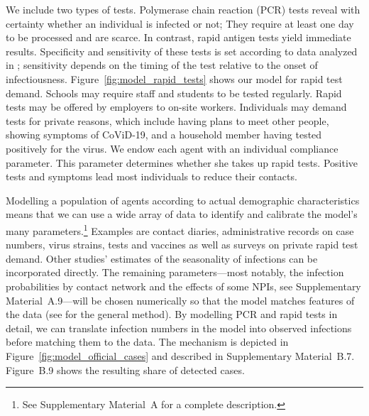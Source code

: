 \documentclass[12pt]{article}
\begin{document}
We include two types of tests. Polymerase chain reaction (PCR) tests reveal with
certainty whether an individual is infected or not; They require at least one day to be
processed and are scarce. In contrast, rapid antigen tests yield immediate results.
Specificity and sensitivity of these tests is set according to data analyzed in
\cite{Bruemmer2021, Smith2021}; sensitivity depends on the timing of the test relative
to the onset of infectiousness. Figure~\ref{fig:model_rapid_tests} shows our model for
rapid test demand. Schools may require staff and students to be tested regularly. Rapid
tests may be offered by employers to on-site workers. Individuals may demand tests for
private reasons, which include having plans to meet other people, showing symptoms of
CoViD-19, and a household member having tested positively for the virus. We endow each
agent with an individual compliance parameter. This parameter determines whether she
takes up rapid tests. Positive tests and symptoms lead most individuals to reduce their
contacts.

Modelling a population of agents according to actual demographic characteristics means
that we can use a wide array of data to identify and calibrate the model's many
parameters.\footnote{See Supplementary Material~A for a complete description.} Examples
are contact diaries, administrative records on case numbers, virus strains, tests and
vaccines as well as surveys on private rapid test demand. Other studies' estimates of
the seasonality of infections can be incorporated directly. The remaining
parameters---most notably, the infection probabilities by contact network and the
effects of some NPIs, see Supplementary Material~A.9---will be chosen numerically so
that the model matches features of the data (see \cite{McFadden1989} for the general
method). By modelling PCR and rapid tests in detail, we can translate infection numbers
in the model into observed infections before matching them to the data. The mechanism is
depicted in Figure~\ref{fig:model_official_cases} and described in Supplementary
Material~B.7. Figure~B.9 shows the resulting share of detected cases.
\end{document}
